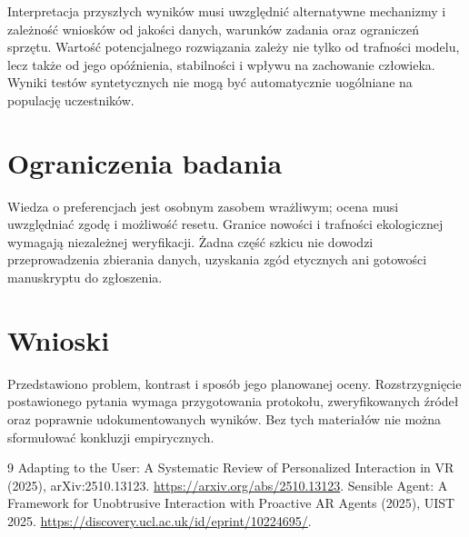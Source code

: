 \documentclass[11pt,a4paper]{article}
\begin{document}
Interpretacja przyszłych wyników musi uwzględnić alternatywne mechanizmy i zależność wniosków od jakości danych, warunków zadania oraz ograniczeń sprzętu. Wartość potencjalnego rozwiązania zależy nie tylko od trafności modelu, lecz także od jego opóźnienia, stabilności i wpływu na zachowanie człowieka. Wyniki testów syntetycznych nie mogą być automatycznie uogólniane na populację uczestników.

\section{Ograniczenia badania}

Wiedza o preferencjach jest osobnym zasobem wrażliwym; ocena musi uwzględniać zgodę i możliwość resetu. Granice nowości i trafności ekologicznej wymagają niezależnej weryfikacji. Żadna część szkicu nie dowodzi przeprowadzenia zbierania danych, uzyskania zgód etycznych ani gotowości manuskryptu do zgłoszenia.

\section{Wnioski}

Przedstawiono problem, kontrast i sposób jego planowanej oceny. Rozstrzygnięcie postawionego pytania wymaga przygotowania protokołu, zweryfikowanych źródeł oraz poprawnie udokumentowanych wyników. Bez tych materiałów nie można sformułować konkluzji empirycznych.

\begin{thebibliography}{9}
 Adapting to the User: A Systematic Review of Personalized Interaction in VR (2025), arXiv:2510.13123. \url{https://arxiv.org/abs/2510.13123}.
 Sensible Agent: A Framework for Unobtrusive Interaction with Proactive AR Agents (2025), UIST 2025. \url{https://discovery.ucl.ac.uk/id/eprint/10224695/}.
\end{thebibliography}
\end{document}
